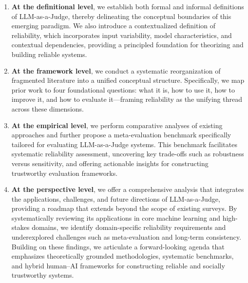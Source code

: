 \begin{enumerate}
    \item \textbf{At the definitional level}, we establish both formal and informal definitions of LLM-as-a-Judge, thereby delineating the conceptual boundaries of this emerging paradigm. We also introduce a contextualized definition of reliability, which incorporates input variability, model characteristics, and contextual dependencies, providing a principled foundation for theorizing and building reliable systems.
    
    \item \textbf{At the framework level}, we conduct a systematic reorganization of fragmented literature into a unified conceptual structure. Specifically, we map prior work to four foundational questions: what it is, how to use it, how to improve it, and how to evaluate it—framing reliability as the unifying thread across these dimensions.
    
    \item \textbf{At the empirical level}, we perform comparative analyses of existing approaches and further propose a meta-evaluation benchmark specifically tailored for evaluating LLM-as-a-Judge systems. This benchmark facilitates systematic reliability assessment, uncovering key trade-offs such as robustness versus sensitivity, and offering actionable insights for constructing trustworthy evaluation frameworks.
    
    \item \textbf{At the perspective level}, we offer a comprehensive analysis that integrates the applications, challenges, and future directions of LLM-as-a-Judge, providing a roadmap that extends beyond the scope of existing surveys. By systematically reviewing its applications in core machine learning and high-stakes domains, we identify domain-specific reliability requirements and underexplored challenges such as meta-evaluation and long-term consistency. Building on these findings, we articulate a forward-looking agenda that emphasizes theoretically grounded methodologies, systematic benchmarks, and hybrid human–AI frameworks for constructing reliable and socially trustworthy systems.

\end{enumerate}


